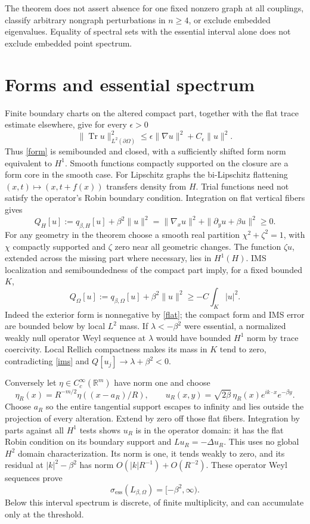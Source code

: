 \documentclass[11pt]{article}
\newcommand{\R}{\mathbb R}
\newcommand{\ess}{\mathrm{ess}}
\begin{document}
The theorem does not assert absence for one fixed nonzero graph at all
couplings, classify arbitrary nongraph perturbations in $n\ge4$, or exclude
embedded eigenvalues. Equality of spectral sets with the essential interval
alone does not exclude embedded point spectrum.

\section{Forms and essential spectrum}
Finite boundary charts on the altered compact part, together with the flat
trace estimate elsewhere, give for every $\epsilon>0$
\[
 \|\operatorname{Tr}u\|^2_{L^2(\partial\Omega)}
 \le \epsilon\|\nabla u\|^2+C_\epsilon\|u\|^2.
\]
Thus \eqref{form} is semibounded and closed, with a sufficiently shifted form
norm equivalent to $H^1$. Smooth functions compactly supported on the closure
are a form core in the smooth case. For Lipschitz graphs the bi-Lipschitz
flattening $(x,t)\mapsto(x,t+f(x))$ transfers density from $H$. Trial functions
need not satisfy the operator's Robin boundary condition.
Integration on flat vertical fibers gives
\begin{equation}\label{flat}
 Q_H[u]:=q_{\beta,H}[u]+\beta^2\|u\|^2
 =\|\nabla_xu\|^2+\|\partial_yu+\beta u\|^2\ge0.
\end{equation}
For any geometry in the theorem choose a smooth real partition
$\chi^2+\zeta^2=1$, with $\chi$ compactly supported and $\zeta$ zero near all
geometric changes. The function $\zeta u$, extended across the missing part
where necessary, lies in $H^1(H)$. IMS localization and semiboundedness of the
compact part imply, for a fixed bounded $K$,
\begin{equation}\label{ims}
 Q_\Omega[u]:=q_{\beta,\Omega}[u]+\beta^2\|u\|^2
 \ge -C\int_K|u|^2.
\end{equation}
Indeed the exterior form is nonnegative by \eqref{flat}; the compact form and
IMS error are bounded below by local $L^2$ mass.
If $\lambda<-\beta^2$ were essential, a normalized weakly null operator Weyl
sequence at $\lambda$ would have bounded $H^1$ norm by trace coercivity.
Local Rellich compactness makes its mass in $K$ tend to zero, contradicting
\eqref{ims} and $Q[u_j]\to\lambda+\beta^2<0$.

Conversely let $\eta\in C_c^\infty(\R^m)$ have norm one and choose
\[
 \eta_R(x)=R^{-m/2}\eta((x-a_R)/R),\qquad
 u_R(x,y)=\sqrt{2\beta}\,\eta_R(x)e^{ik\cdot x}e^{-\beta y}.
\]
Choose $a_R$ so the entire tangential support escapes to infinity and lies
outside the projection of every alteration. Extend by zero off those flat
fibers. Integration by parts against all $H^1$ tests shows $u_R$ is in the
operator domain: it has the flat Robin condition on its boundary support and
$L u_R=-\Delta u_R$. This uses no global $H^2$ domain characterization.
Its norm is one, it tends weakly to zero, and its residual at
$|k|^2-\beta^2$ has norm $O(|k|R^{-1})+O(R^{-2})$.
These operator Weyl sequences prove
\begin{equation}\label{ess}
 \sigma_\ess(L_{\beta,\Omega})=[-\beta^2,\infty).
\end{equation}
Below this interval spectrum is discrete, of finite multiplicity, and can
accumulate only at the threshold.
\end{document}
